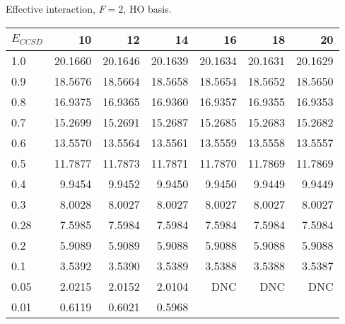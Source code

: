 \begin{table}
\begin{center}
Effective interaction, $F=2$, HO basis.\\
\begin{tabular}{l|rrrrrr}
\hline 
$E_{CCSD}$ & 10 & 12 & 14 & 16 & 18 & 20 \\
\hline \hline
1.0 & 20.1660 & 20.1646 & 20.1639 & 20.1634 & 20.1631 & 20.1629  \\ 
0.9 & 18.5676 & 18.5664 & 18.5658 & 18.5654 & 18.5652 & 18.5650  \\ 
0.8 & 16.9375 & 16.9365 & 16.9360 & 16.9357 & 16.9355 & 16.9353  \\ 
0.7 & 15.2699 & 15.2691 & 15.2687 & 15.2685 & 15.2683 & 15.2682  \\ 
0.6 & 13.5570 & 13.5564 & 13.5561 & 13.5559 & 13.5558 & 13.5557  \\ 
0.5 & 11.7877 & 11.7873 & 11.7871 & 11.7870 & 11.7869 & 11.7869  \\ 
0.4 & 9.9454 & 9.9452 & 9.9450 & 9.9450 & 9.9449 & 9.9449  \\ 
0.3 & 8.0028 & 8.0027 & 8.0027 & 8.0027 & 8.0027 & 8.0027  \\ 
0.28 & 7.5985 & 7.5984 & 7.5984 & 7.5984 & 7.5984 & 7.5984  \\ 
0.2 & 5.9089 & 5.9089 & 5.9088 & 5.9088 & 5.9088 & 5.9088  \\ 
0.1 & 3.5392 & 3.5390 & 3.5389 & 3.5388 & 3.5388 & 3.5387  \\ 
0.05 & 2.0215 & 2.0152 & 2.0104 & DNC & DNC & DNC  \\ 
0.01 & 0.6119 & 0.6021 & 0.5968  \\ 
\hline \hline
\end{tabular}
\end{center}
\end{table}

